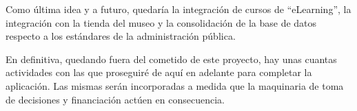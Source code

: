 \par Como última idea y a futuro, quedaría la integración de cursos de ``eLearning'', la integración con la tienda del museo y la consolidación de la base de datos respecto a los estándares de la administración pública.
\par En definitiva, quedando fuera del cometido de este proyecto, hay unas cuantas actividades con las que proseguiré de aquí en adelante para completar la aplicación. Las mismas serán incorporadas a medida que la maquinaria de toma de decisiones y financiación actúen en consecuencia.
